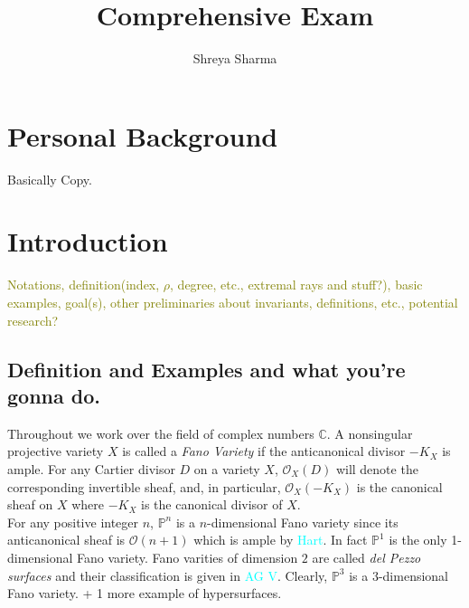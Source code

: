 \documentclass[12pt]{amsart}
\theoremstyle{plain}
\theoremstyle{definition}
\theoremstyle{expl}
\begin{document}
	\title{\large{Comprehensive Exam}}
	\date{}
	\author{\small{Shreya Sharma}}
	\maketitle
	\tableofcontents
	
\section{Personal Background}
\noindent Basically Copy.
\section{Introduction}
\textcolor{olive}{Notations, definition(index, $\rho$, degree, etc., extremal rays and stuff?), basic examples, goal(s), other preliminaries about invariants, definitions, etc., potential research?}
\subsection{Definition and Examples and what you're gonna do.} Throughout we work over the field of complex numbers $\mathbb{C}$.
A nonsingular projective variety $X$ is called a \textit{Fano Variety} if the anticanonical divisor $-K_X$ is ample.
For any Cartier divisor $D$ on a variety $X$, $\mathcal{O}_X(D)$ will denote the corresponding invertible sheaf, and, in particular, $\mathcal{O}_X(-K_X)$ is the canonical sheaf on $X$ where $-K_X$ is the canonical divisor of $X$. \\
	
For any positive integer $n$,  $\mathbb{P}^n$ is a $n$-dimensional Fano variety since its anticanonical sheaf is $\mathcal{O}(n+1)$ which is ample by \textcolor{cyan}{Hart}. In fact $\mathbb{P}^1$ is the only 1-dimensional Fano variety. Fano varities of dimension $2$ are called \textit{del Pezzo surfaces} and their classification is given in \textcolor{cyan}{AG V}. Clearly, $\mathbb{P}^3$ is a $3$-dimensional Fano variety. + 1 more example of hypersurfaces.
\end{document}
